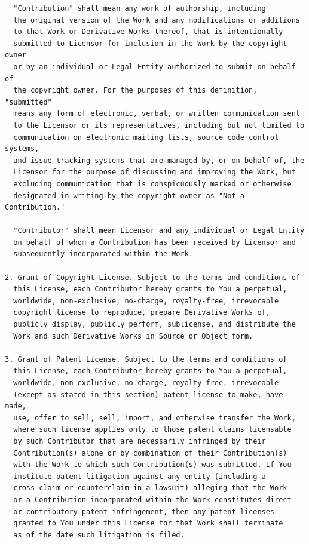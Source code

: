 \begin{verbatim}
  "Contribution" shall mean any work of authorship, including
  the original version of the Work and any modifications or additions
  to that Work or Derivative Works thereof, that is intentionally
  submitted to Licensor for inclusion in the Work by the copyright owner
  or by an individual or Legal Entity authorized to submit on behalf of
  the copyright owner. For the purposes of this definition, "submitted"
  means any form of electronic, verbal, or written communication sent
  to the Licensor or its representatives, including but not limited to
  communication on electronic mailing lists, source code control systems,
  and issue tracking systems that are managed by, or on behalf of, the
  Licensor for the purpose of discussing and improving the Work, but
  excluding communication that is conspicuously marked or otherwise
  designated in writing by the copyright owner as "Not a Contribution."

  "Contributor" shall mean Licensor and any individual or Legal Entity
  on behalf of whom a Contribution has been received by Licensor and
  subsequently incorporated within the Work.

2. Grant of Copyright License. Subject to the terms and conditions of
  this License, each Contributor hereby grants to You a perpetual,
  worldwide, non-exclusive, no-charge, royalty-free, irrevocable
  copyright license to reproduce, prepare Derivative Works of,
  publicly display, publicly perform, sublicense, and distribute the
  Work and such Derivative Works in Source or Object form.

3. Grant of Patent License. Subject to the terms and conditions of
  this License, each Contributor hereby grants to You a perpetual,
  worldwide, non-exclusive, no-charge, royalty-free, irrevocable
  (except as stated in this section) patent license to make, have made,
  use, offer to sell, sell, import, and otherwise transfer the Work,
  where such license applies only to those patent claims licensable
  by such Contributor that are necessarily infringed by their
  Contribution(s) alone or by combination of their Contribution(s)
  with the Work to which such Contribution(s) was submitted. If You
  institute patent litigation against any entity (including a
  cross-claim or counterclaim in a lawsuit) alleging that the Work
  or a Contribution incorporated within the Work constitutes direct
  or contributory patent infringement, then any patent licenses
  granted to You under this License for that Work shall terminate
  as of the date such litigation is filed.


\end{verbatim}
